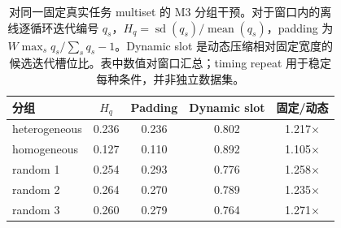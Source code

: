 \begin{table}[t]
\centering
\caption{对同一固定真实任务 multiset 的 M3 分组干预。对于窗口内的离线逐循环迭代编号 $q_s$，$H_q=\operatorname{sd}(q_s)/\operatorname{mean}(q_s)$，padding 为 $W\max_s q_s/\sum_s q_s-1$。Dynamic slot 是动态压缩相对固定宽度的候选迭代槽位比。表中数值对窗口汇总；timing repeat 用于稳定每种条件，并非独立数据集。}
\label{tab:m3-grouping}
\scriptsize
\setlength{\tabcolsep}{3pt}
\begin{tabular}{@{}lcccc@{}}
\toprule
分组 & $H_q$ & Padding & Dynamic slot & 固定/动态 \\
\midrule
heterogeneous & 0.236 & 0.236 & 0.802 & 1.217$\times$ \\
homogeneous & 0.127 & 0.110 & 0.892 & 1.105$\times$ \\
random 1 & 0.254 & 0.293 & 0.776 & 1.258$\times$ \\
random 2 & 0.264 & 0.270 & 0.789 & 1.235$\times$ \\
random 3 & 0.260 & 0.279 & 0.764 & 1.271$\times$ \\
\bottomrule
\end{tabular}
\end{table}
